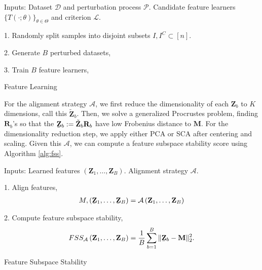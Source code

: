 \begin{algorithm}[H]
\SetAlgoLined
{}
Inputs: Dataset $\mathcal{D}$ and perturbation process $\mathcal{P}$. Candidate
feature learners $\{T\left(\cdot; \theta\right)\}_{\theta \in \Theta}$ and
criterion $\mathcal{L}$.

1. Randomly split samples into disjoint subsets $I, I^{C} \subset \left[n\right]$.

2. Generate $B$ perturbed datasets,


3. Train $B$ feature learners,

\caption{Feature Learning}
\label{alg:features}
\end{algorithm}

For the alignment strategy $\mathcal{A}$, we first reduce the dimensionality of
each $\mathbf{Z}_{b}$ to $K$ dimensions, call this $\tilde{\mathbf{Z}}_{b}$.
Then, we solve a generalized Procrustes problem, finding $\mathbf{R}_{b}$'s so
that the $\underaccent{\bar}{\mathbf{Z}}_{b} :=
\tilde{\mathbf{Z}}_{b}\mathbf{R}_{b}$ have low Frobenius distance to
$\mathbf{M}$. For the dimensionality reduction step, we apply either PCA or SCA
after centering and scaling. Given this $\mathcal{A}$, we can compute a feature
subspace stability score using Algorithm \ref{alg:fss}.

\begin{algorithm}[H]
  \SetAlgoLined
  Inputs: Learned features $\left(\mathbf{Z}_{1}, \dots, \mathbf{Z}_{B}\right)$.
  Alignment strategy $\mathcal{A}$.

  1. Align features,
  \begin{align*}
    M, \left(\underaccent{\bar}{\mathbf{Z}}_{1}, \dots, \underaccent{\bar}{\mathbf{Z}}_{B}\right) = \mathcal{A}\left(\mathbf{Z}_{1}, \dots, \mathbf{Z}_{B}\right)
  \end{align*}

  2. Compute feature subspace stability,
  \begin{align*}
    FSS_{\mathcal{A}}\left(\mathbf{Z}_{1}, \dots, \mathbf{Z}_{B}\right) = \frac{1}{B} \sum_{b = 1}^{B} \|\underaccent{\bar}{\mathbf{Z}}_{b} - \mathbf{M}\|^{2}_{2}.
  \end{align*}
  \caption{Feature Subspace Stability}
  \label{alg:fss}
\end{algorithm}

